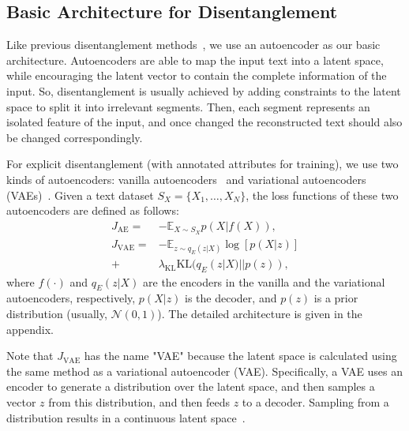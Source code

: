 \documentclass[11pt,a4paper]{article}
\renewcommand{\cite}{\citep}
\begin{document}
\subsection{Basic Architecture for Disentanglement}
Like previous disentanglement methods~\cite{higgins2017beta,john-etal-2019-disentangled,sha2021multi}, we use an autoencoder as our basic architecture. Autoencoders are able to map the input text into a latent space, while encouraging the latent vector to contain the complete information of the input. So,  disentanglement is usually achieved by adding constraints to  the   latent space to  split it into irrelevant segments. Then, each segment represents an isolated feature of the input, and once changed the reconstructed text should also be changed correspondingly.


For explicit disentanglement (with annotated attributes for training), we use two kinds of autoencoders: vanilla autoencoders~\cite{hinton1994autoencoders} and variational autoencoders (VAEs)~\cite{kingma2014auto}. Given a text dataset $S_X=\{X_1, \ldots, X_N\}$, the loss functions of these two autoencoders are defined as follows:
\begin{align}
  J_\text{AE} =& -\mathbb E_{X\sim S_X} p(X|f(X)),\\
  J_\text{VAE} =&-\mathbb E_{z\sim q_E(z|X)}\log [p(X|z)] \nonumber\\
  +& \lambda_\text{KL}\text{KL}(q_E(z|X)||p(z))\label{eq:vae},
\end{align}
where $f(\cdot)$ and $q_E(z|X)$  are the encoders in the vanilla  and the variational autoencoders, respectively, $p(X|z)$ is the  decoder, and $p(z)$ is a prior distribution (usually, $\mathcal N(0,1)$).
The detailed architecture %
is given in the appendix.

Note that $J_{\text{VAE}}$ has the name "VAE" because the latent space is calculated using the same method as a variational autoencoder (VAE). Specifically, a VAE uses an encoder to generate a distribution over the latent space, and then samples a vector $z$ from this distribution, and then feeds $z$ to a decoder. Sampling from a distribution results in a continuous latent space~\cite{bowman2016generating}.

\end{document}
